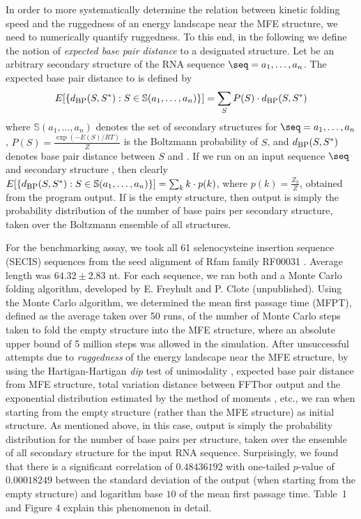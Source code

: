 In order to more systematically determine the relation between kinetic
folding speed and the ruggedness of an energy landscape near the MFE structure,
we need to numerically quantify ruggedness. To this end, in the following
we define the notion of {\em expected base pair distance} to a designated
structure. Let \strSt be an arbitrary secondary structure of the RNA sequence
$\seq = a_1,\dots,a_n$.
The expected base pair distance to \strSt is defined by
\begin{eqnarray}
\label{eq:expectedBasePairDist}
E[ \{ d_{\mbox{\sc bp}}(S,S^*): S \in \mathbb{S}(a_1,\ldots,a_n)\} ]  =
\sum_{S} P(S) \cdot d_{\mbox{\sc bp}}(S,S^*)
\end{eqnarray}
where
$\mathbb{S}(a_1,\ldots,a_n)$ denotes the set of secondary structures for
$\seq = a_1,\dots,a_n$, $P(S) = \frac{\exp(-E(S)/RT)}{Z}$ is the Boltzmann
probability of $S$, and
$d_{\mbox{\sc bp}}(S,S^*)$ denotes base pair distance between $S$ and \strSt.
If we run \fftbor on an input sequence $\seq$ and secondary structure
\strSt, then clearly
$E[ \{ d_{\mbox{\sc bp}}(S,S^*): S \in \mathbb{S}(a_1,\ldots,a_n)\} ]  =
\sum_{k} k \cdot p(k)$, where $p(k)=\frac{Z_k}{Z}$, obtained from the
program output.  If \strSt is the empty structure, then \fftbor output
is simply the probability distribution of the number of base pairs per
secondary structure, taken over the Boltzmann ensemble of all structures.

For the benchmarking assay, we took all 61 selenocysteine insertion sequence
(SECIS) sequences from the seed alignment of Rfam family RF00031
\cite{Gardner.nar11}. Average length was $64.32 \pm 2.83$ nt.
For each sequence, we ran both \fftbor and a Monte Carlo
folding algorithm, developed by E. Freyhult and P. Clote (unpublished).
Using the Monte Carlo algorithm, we
determined the mean first passage time (MFPT), defined as the average
taken over 50 runs, of the number of Monte Carlo steps taken to fold
the empty structure into the MFE structure, where an absolute upper bound
of 5 million steps was allowed in the simulation.  After unsuccessful
attempts due to {\em ruggedness} of the energy landscape near the MFE structure,
by using the Hartigan-Hartigan {\em dip} test of unimodality
\cite{hartiganDipTest},
expected base pair distance from MFE structure, total variation distance
between FFTbor output and the exponential distribution estimated by
the method of moments \cite{zar:biostatistics}, etc.,
we ran \fftbor
when starting from the empty structure (rather than the MFE structure)
as initial structure.
As mentioned above, in this case, \fftbor output is simply
the probability distribution
for the number of base pairs per structure, taken over the ensemble
of all secondary structure for the input RNA
sequence. Surprisingly, we found that there is a significant
correlation of  $0.48436192$ with one-tailed
$p$-value of $0.00018249$ between the
standard deviation of the \fftbor output (when starting from the
empty structure) and logarithm base $10$ of the mean first passage time.
Table~1 and Figure 4 explain this phenomenon in detail.

